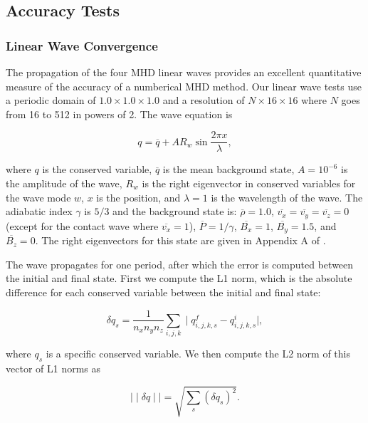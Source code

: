 \documentclass[modern]{aastex631}
\begin{document}
\subsection{Accuracy Tests}
\label{sec:accuracy_tests}

\subsubsection{Linear Wave Convergence}
\label{sec:lwc}

The propagation of the four MHD linear waves provides an excellent quantitative measure of the accuracy of a numberical MHD method. Our linear wave tests use a periodic domain of $1.0\times1.0\times1.0$ and a resolution of $N\times16\times16$ where $N$ goes from 16 to 512 in powers of 2. The wave equation is

\begin{equation}
    q = \overline{q} + A R_w \sin{\frac{2\pi x}{\lambda}},
\end{equation}

\noindent where $q$ is the conserved variable, $\overline{q}$ is the mean background state, $A=10^{-6}$ is the amplitude of the wave, $R_w$ is the right eigenvector in conserved variables for the wave mode $w$, $x$ is the position, and $\lambda=1$ is the wavelength of the wave. The adiabatic index $\gamma$ is $5/3$ and the background state is:
$\overline{\rho}=1.0$,
$\overline{v_x}=\overline{v_y}=\overline{v_z}=0$ (except for the contact wave where $\overline{v_x} = 1$),
$\overline{P}=1/\gamma$,
$\overline{B_x}=1$,
$\overline{B_y}=1.5$,
and $\overline{B_z}=0$.
The right eigenvectors for this state are given in Appendix A of \cite{gardiner_unsplit_2008}.

The wave propagates for one period, after which the error is computed between the initial and final state. First we compute the L1 norm, which is the absolute difference for each conserved variable between the initial and final state:

\begin{equation}
    \delta q_s = \frac{1}{n_x n_y n_z} \sum_{i,j,k} \mid q^f_{i,j,k,s} - q^i_{i,j,k,s} \mid,
\end{equation}

\noindent where $q_s$ is a specific conserved variable. We then compute the L2 norm of this vector of L1 norms as

\begin{equation}
    \mid \mid \delta q \mid \mid = \sqrt{\sum_s \left( \delta q_s \right)^2}.
\end{equation}
\end{document}
